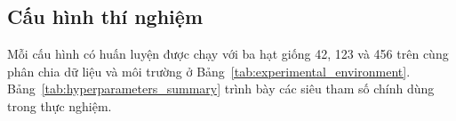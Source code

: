 \subsection{Cấu hình thí nghiệm}
\label{sec:experimental_setup}
Mỗi cấu hình có huấn luyện được chạy với ba hạt giống 42, 123 và 456 trên cùng phân chia dữ liệu và môi trường ở Bảng~\ref{tab:experimental_environment}. Bảng~\ref{tab:hyperparameters_summary} trình bày các siêu tham số chính dùng trong thực nghiệm.

\begin{table}[H]
\centering
{}
\caption{Môi trường thực nghiệm}
\label{tab:experimental_environment}
\end{table}

